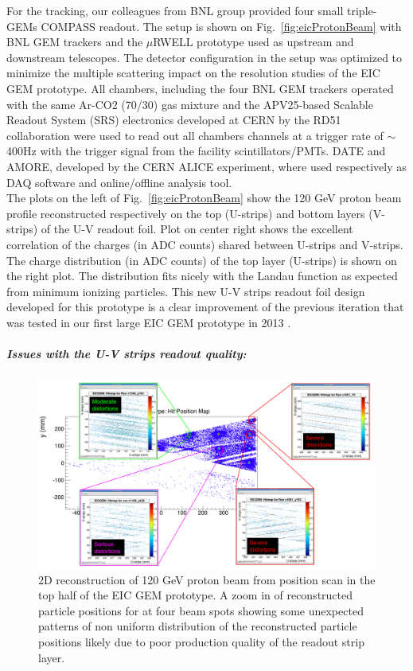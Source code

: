 For the tracking, our colleagues from BNL group provided four small triple-GEMs COMPASS readout. The setup is shown on Fig.~\ref{fig:eicProtonBeam} with  BNL GEM trackers and the $\mu$RWELL prototype used as upstream and downstream telescopes. The detector configuration in the setup  was optimized to minimize the  multiple scattering impact on the resolution studies of the EIC GEM prototype. All chambers, including the four BNL GEM trackers operated with the same Ar-CO2 (70/30) gas mixture and the APV25-based Scalable Readout System (SRS) electronics developed at CERN by the RD51 collaboration were used to read out all chambers channels at a trigger rate of $\sim$ 400Hz with the trigger signal from the facility scintillators/PMTs. DATE and AMORE, developed by the CERN ALICE experiment, where used respectively as DAQ software and online/offline  analysis tool.\\
 The plots on the left of Fig.~\ref{fig:eicProtonBeam} show the 120 GeV proton beam profile reconstructed respectively on the top (U-strips) and bottom layers (V-strips) of the U-V readout foil.  Plot on center right shows the excellent correlation of the charges (in ADC counts)  shared between U-strips and V-strips. The  charge distribution (in ADC counts) of the top layer (U-strips) is shown on the right plot. The distribution fits nicely with the Landau function as expected from minimum ionizing particles. This new U-V strips readout foil design developed for this prototype is a clear improvement of the previous iteration that was tested in our  first large EIC GEM prototype in 2013 \cite{Gnanvo:2015xda}. 
%
\subparagraph*{\textbf Issues with the U-V strips readout quality:}
%
\begin{figure}[htb]
\centering
\includegraphics[width=1\columnwidth,trim={0pt 0mm 0pt 0mm},clip]{UVa_plots/eicPosScan}
\caption{\label{fig:eicPosScan}  2D  reconstruction of 120 GeV proton beam from position scan in the top half of the EIC GEM prototype. A zoom in of  reconstructed particle positions for at four beam spots showing some unexpected patterns of non uniform distribution of the reconstructed particle positions likely due to poor production quality of the readout strip layer.}
\end{figure}
